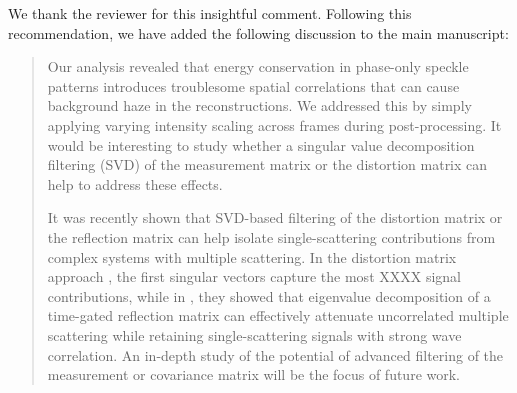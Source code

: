 \documentclass[12pt]{article}
\newcommand{\hlred}[1]{\sethlcolor{red!30}\hl{#1}}
\newenvironment{ourresponse}
    {\begin{tcolorbox}[width=\linewidth,breakable,enhanced,colback=gray!5,colframe=responsecolor!50,title=Response,left=5pt,right=5pt]}
    {\end{tcolorbox}}
\begin{document}
\begin{ourresponse}

    

    We thank the reviewer for this insightful comment. Following this recommendation, we have added the following discussion to the main manuscript:
    
    \begin{quote}
        Our analysis revealed that energy conservation in phase-only speckle patterns introduces troublesome spatial correlations that can cause background haze in the reconstructions. We addressed this by simply applying varying intensity scaling across frames during post-processing. It would be interesting to study whether a singular value decomposition filtering (SVD) of the measurement matrix or the distortion matrix \cite{badon2020distortion,jo2022through} can help to address these effects.
        

        It was recently shown that SVD-based filtering of the distortion matrix \cite{badon2020distortion} or the reflection matrix \cite{jo2022through} can help isolate single-scattering contributions from complex systems with multiple scattering. In the distortion matrix approach \cite{badon2020distortion}, the first singular vectors capture the most XXXX signal contributions, while in \cite{jo2022through}, they showed that eigenvalue decomposition of a time-gated reflection matrix can effectively attenuate uncorrelated multiple scattering while retaining single-scattering signals with strong wave correlation. An in-depth study of the potential of advanced filtering of the measurement or covariance matrix will be the focus of future work.


\end{quote}
\end{ourresponse}
\end{document}
